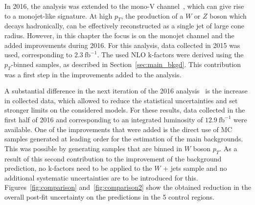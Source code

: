 In 2016, the analysis was extended to the mono-V channel~\cite{CMS:2016tns}, which can give rise to a monojet-like signature. At high $p_T$, the production of a $W$ or $Z$ boson which decays hadronically, can be effectively reconstructed as a single jet of large cone radius. However, in this chapter the focus is on the monojet channel and the added improvements during 2016. For this analysis, data collected in 2015 was used, corresponding to $2.3\ \mathrm{fb}^{-1}$. The used \ac{NLO} k-factors were derived using the $p_T$-binned samples, as described in Section~\ref{sec:main_bkgd}. This contribution was a first step in the improvements added to the analysis.

A substantial difference in the next iteration of the 2016 analysis~\cite{Sirunyan:2017hci} is the increase in collected data, which allowed to reduce the statistical uncertainties and set stronger limits on the considered models. For these results, data collected in the first half of 2016 and corresponding to an integrated luminosity of $12.9\ \mathrm{fb}^{-1}$ were available. One of the improvements that were added is the direct use of MC samples generated at leading order for the estimation of the main backgrounds. This was possible by generating samples that are binned in $W$ boson $p_T$. As a result of this second contribution to the improvement of the background prediction, no k-factors need to be applied to the $W$ + jets sample and no additional systematic uncertainties are to be introduced for this. Figures~\ref{fig:comparison} and~\ref{fig:comparison2} show the obtained reduction in the overall post-fit uncertainty on the predictions in the 5 control regions.

